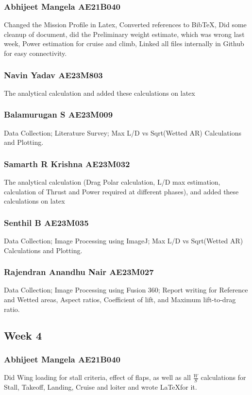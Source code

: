 \documentclass[12 pt]{article}
\begin{document}
\subsubsection{Abhijeet Mangela AE21B040}
Changed the Mission Profile in Latex, Converted references to BibTeX, Did some cleanup of document, did the Preliminary weight estimate, which was wrong last week, Power estimation for cruise and climb, Linked all files internally in Github for easy connectivity.

\subsubsection{Navin Yadav AE23M803}
The analytical calculation and added these calculations on latex 

\subsubsection{Balamurugan S AE23M009}
Data Collection; Literature Survey; Max L/D vs Sqrt(Wetted AR) Calculations and Plotting.


\subsubsection{Samarth R Krishna AE23M032}
The analytical calculation (Drag Polar calculation, L/D max estimation, calculation of Thrust and Power required at different phases), and added these calculations on latex


\subsubsection{Senthil B AE23M035}
Data Collection; Image Processing using ImageJ; Max L/D vs Sqrt(Wetted AR) Calculations and Plotting.


\subsubsection{Rajendran Anandhu Nair AE23M027}
Data Collection; Image Processing using Fusion 360; Report writing for Reference and Wetted areas, Aspect ratios, Coefficient of lift, and Maximum lift-to-drag ratio. 

\subsection{Week 4}


\subsubsection{Abhijeet Mangela AE21B040}
Did Wing loading for stall criteria, effect of flaps, as well as all $\frac{W}{S}$ calculations for Stall, Takeoff, Landing, Cruise and loiter and wrote \LaTeX for it.
\end{document}

